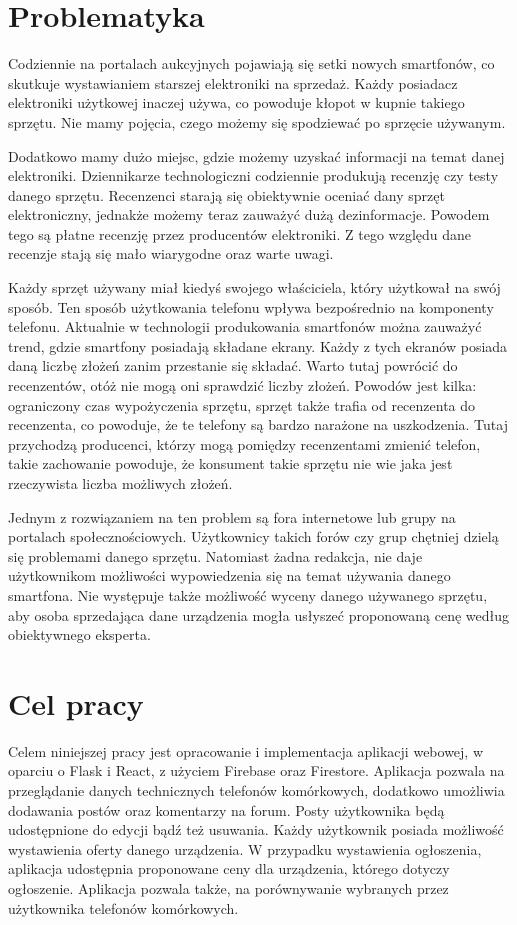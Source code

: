 \section{Problematyka}
Codziennie na portalach aukcyjnych pojawiają się setki nowych smartfonów, co skutkuje wystawianiem starszej elektroniki na sprzedaż. Każdy posiadacz elektroniki użytkowej inaczej używa, co powoduje kłopot w kupnie takiego sprzętu. Nie mamy pojęcia, czego możemy się spodziewać po sprzęcie używanym.

Dodatkowo mamy dużo miejsc, gdzie możemy uzyskać informacji na temat danej elektroniki. Dziennikarze technologiczni codziennie produkują recenzję czy testy danego sprzętu. Recenzenci starają się obiektywnie oceniać dany sprzęt elektroniczny, jednakże możemy teraz zauważyć dużą dezinformacje. Powodem tego są płatne recenzję przez producentów elektroniki. Z tego względu dane recenzje stają się mało wiarygodne oraz warte uwagi.

Każdy sprzęt używany miał kiedyś swojego właściciela, który użytkował na swój sposób. Ten sposób użytkowania telefonu wpływa bezpośrednio na komponenty telefonu. Aktualnie w technologii produkowania smartfonów można zauważyć trend, gdzie smartfony posiadają składane ekrany. Każdy z tych ekranów posiada daną liczbę złożeń zanim przestanie się składać. Warto tutaj powrócić do recenzentów, otóż nie mogą oni sprawdzić liczby złożeń. Powodów jest kilka: ograniczony czas wypożyczenia sprzętu, sprzęt także trafia od recenzenta do recenzenta, co powoduje, że te telefony są bardzo narażone na uszkodzenia. Tutaj przychodzą producenci, którzy mogą pomiędzy recenzentami zmienić telefon, takie zachowanie powoduje, że konsument takie sprzętu nie wie jaka jest rzeczywista liczba możliwych złożeń.

Jednym z rozwiązaniem na ten problem są fora internetowe lub grupy na portalach społecznościowych. Użytkownicy takich forów czy grup chętniej dzielą się problemami danego sprzętu. Natomiast żadna redakcja, nie daje użytkownikom możliwości wypowiedzenia się na temat używania danego smartfona. Nie występuje także możliwość wyceny danego używanego sprzętu, aby osoba sprzedająca dane urządzenia mogła usłyszeć proponowaną cenę według obiektywnego eksperta.

\section{Cel pracy}
Celem niniejszej pracy jest opracowanie i implementacja aplikacji webowej, w oparciu o Flask i React, z użyciem Firebase oraz Firestore. Aplikacja pozwala na przeglądanie danych technicznych telefonów komórkowych, dodatkowo umożliwia dodawania postów oraz komentarzy na forum. Posty użytkownika będą udostępnione do edycji bądź też usuwania. Każdy użytkownik posiada możliwość wystawienia oferty danego urządzenia. W przypadku wystawienia ogłoszenia, aplikacja udostępnia proponowane ceny dla urządzenia, którego dotyczy ogłoszenie. Aplikacja pozwala także, na porównywanie wybranych przez użytkownika telefonów komórkowych.

